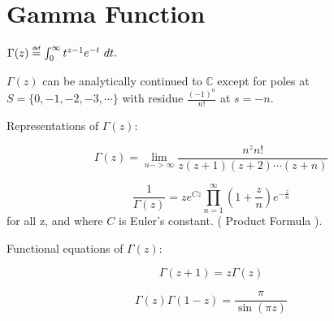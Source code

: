 \newpage

\section{Gamma Function}

$\Gamma(z) \myeq \int_{0}^{\infty} t^{z-1} e^{-t}\ dt .$ 

\noindent $\Gamma(z)$ can be analytically continued to $\mathbb{C}$ except for
poles at $S=\{0, -1, -2, -3, \cdots \}$ with residue $\frac{(-1)^n}{n!}$ at
$s=-n$.

Representations of $\Gamma(z)$:

$$\Gamma(z) = \lim_{n->\infty} \frac{n^{z}n!}{z(z+1)(z+2) \cdots (z+n)}$$

$$\frac{1}{\Gamma(z)} = z e^{Cz} \prod_{n=1}^{\infty}
(1+\frac{z}{n})e^{-\frac{z}{n}}$$
for all z, and where $C$ is Euler's constant. ( Product Formula ).

Functional equations of $\Gamma(z)$:

$$\Gamma(z+1) = z \Gamma(z)$$

$$\Gamma(z)\Gamma(1-z) = \frac{\pi}{\sin{(\pi z)}}$$